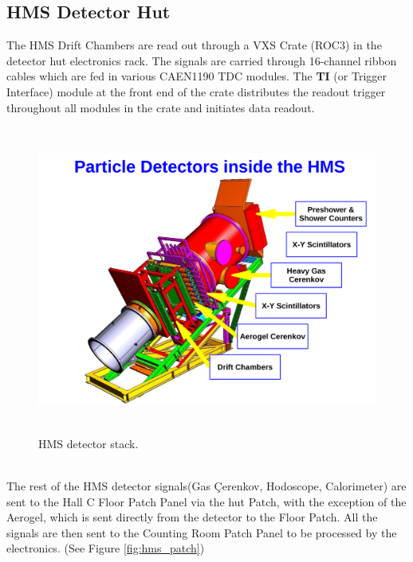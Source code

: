 \documentclass[11pt]{article}
\begin{document}
\subsection{HMS Detector Hut}
The HMS Drift Chambers are read out through a VXS Crate (ROC3) in the detector hut electronics rack. The signals are carried through 16-channel ribbon cables
which are fed in various CAEN1190 TDC modules. The \textbf{TI} (or Trigger Interface) module at the front end of the crate distributes the readout
trigger throughout all modules in the crate and initiates data readout.
\begin{figure}[h!]
  \centering
  \includegraphics[width=5.0in, height=4.0in]{images/HMS_stack.pdf}
  \caption{HMS detector stack.}
  \label{fig:hms_stack}
\end{figure}\\
\newpage
\noindent The rest of the HMS detector signals(Gas \c{C}erenkov, Hodoscope, Calorimeter) are
sent to the Hall C Floor Patch Panel via the hut Patch, with the exception
of the Aerogel, which is sent directly from the detector to the Floor Patch.
All the signals are then sent to the Counting Room Patch Panel to be processed
by the electronics. (See Figure \ref{fig:hms_patch})
  
\end{document}
